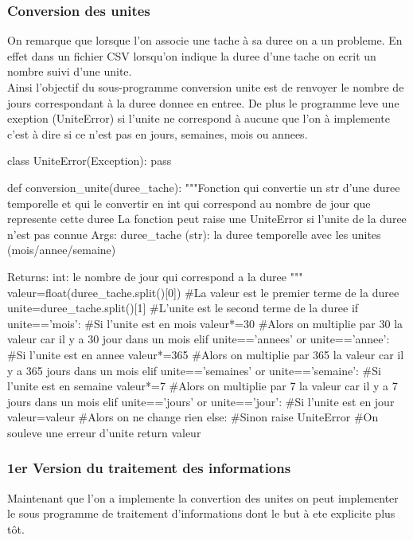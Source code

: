 \documentclass{article}
\begin{document}
\subsubsection{Conversion des unites}
On remarque que lorsque l'on associe une tache à sa duree on a un probleme. En effet dans un fichier CSV lorsqu'on indique la duree d'une tache on ecrit un nombre suivi d'une unite.
\\
Ainsi l'objectif du sous-programme conversion unite est de renvoyer le nombre de jours correspondant à la duree donnee en entree. De plus le programme leve une exeption (UniteError) si l'unite ne correspond à aucune que l'on à implemente c'est à dire si ce n'est pas en jours, semaines, mois ou annees.

\begin{python}
class UniteError(Exception):
    pass

    
def conversion_unite(duree_tache):
    """Fonction qui convertie un str d'une duree temporelle et qui le convertir en int qui correspond au nombre de jour que represente cette duree
    La fonction peut raise une UniteError si l'unite de la duree n'est pas connue
    Args:
        duree_tache (str): la duree temporelle avec les unites (mois/annee/semaine)

    Returns:
        int: le nombre de jour qui correspond a la duree
    """
    valeur=float(duree_tache.split()[0]) #La valeur est le premier terme de la duree 
    unite=duree_tache.split()[1] #L'unite est le second terme de la duree 
    if unite=='mois': #Si l'unite est en mois
        valeur*=30 #Alors on multiplie par 30 la valeur car il y a 30 jour dans un mois 
    elif unite=='annees' or unite=='annee':  #Si l'unite est en annee
        valeur*=365 #Alors on multiplie par 365 la valeur car il y a 365 jours dans un mois 
    elif unite=='semaines' or unite=='semaine': #Si l'unite est en semaine
        valeur*=7  #Alors on multiplie par 7 la valeur car il y a 7 jours dans un mois 
    elif unite=='jours' or unite=='jour': #Si l'unite est en jour
        valeur=valeur #Alors on ne change rien
    else: #Sinon 
        raise UniteError #On souleve une erreur d'unite
    return valeur
\end{python}

\subsubsection{1er Version du traitement des informations}
Maintenant que l'on a implemente la convertion des unites on peut implementer le sous programme de traitement d'informations dont le but à ete explicite plus tôt.
\end{document}
